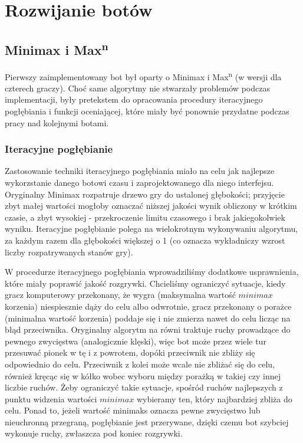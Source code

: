 \documentclass{pracamgr}
\begin{document}
\chapter{Rozwijanie botów}

\section{Minimax i Max\textsuperscript{n}}

Pierwszy zaimplementowany bot był oparty o Minimax i Max\textsuperscript{n} (w wersji dla czterech graczy).
Choć same algorytmy nie stwarzały problemów podczas implementacji, były pretekstem do opracowania procedury iteracyjnego pogłębiania i funkcji oceniającej, które miały być ponownie przydatne podczas pracy nad kolejnymi botami.

\subsection{Iteracyjne pogłębianie}

Zastosowanie techniki iteracyjnego pogłębiania miało na celu jak najlepsze wykorzstanie danego botowi czasu i zaprojektowanego dla niego interfejsu.
Oryginalny Minimax rozpatruje drzewo gry do ustalonej głębokości; przyjęcie zbyt małej wartości mogłoby oznaczać niższej jakości wynik obliczony w krótkim czasie, a zbyt wysokiej - przekroczenie limitu czasowego i brak jakiegokolwiek wyniku.
Iteracyjne pogłębianie polega na wielokrotnym wykonywaniu algorytmu, za każdym razem dla głębokości większej o 1 (co oznacza wykładniczy wzrost liczby rozpatrywanych stanów gry).

W procedurze iteracyjnego pogłębiania wprowadziliśmy dodatkowe usprawnienia, które miały poprawić jakość rozgrywki.
Chcieliśmy ograniczyć sytuacje, kiedy gracz komputerowy przekonany, że wygra (maksymalna wartość \(minimax\) korzenia) niespiesznie dąży do celu albo odwrotnie, gracz przekonany o porażce (minimalna wartość korzenia) poddaje się i nie zmierza nawet do celu licząc na błąd przeciwnika.
Oryginalny algorytm na równi traktuje ruchy prowadzące do pewnego zwycięstwa (analogicznie klęski), więc bot może przez wiele tur przesuwać pionek w tę i z powrotem, dopóki przeciwnik nie zbliży się odpowiednio do celu.
Przeciwnik z kolei może wcale nie zbliżać się do celu, również kręcąc się w kółko wobec wyboru między porażką w takiej czy innej liczbie ruchów.
Żeby ograniczyć takie sytuacje, spośród ruchów najlepszych z punktu widzenia wartości \(minimax\) wybieramy ten, który najbardziej zbliża do celu.
Ponad to, jeżeli wartość minimaks oznacza pewne zwycięstwo lub nieuchronną przegraną, pogłębianie jest przerywane, dzięki czemu bot szybciej wykonuje ruchy, zwłaszcza pod koniec rozgrywki.
\end{document}
